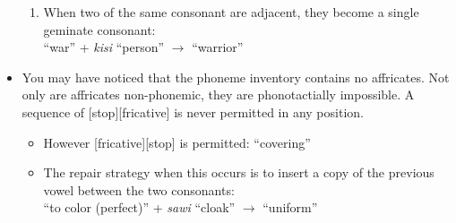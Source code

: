 \documentclass{article}
\begin{document}
\begin{itemize}
\begin{enumerate}
      \item When two of the same consonant are adjacent, they become a single geminate consonant: \\ \textit{} ``war'' + \textit{kisi} ``person'' $\rightarrow$ \textit{} ``warrior''


    \end{enumerate}

  \item You may have noticed that the phoneme inventory contains no affricates. Not only are affricates non-phonemic, they are phonotactially impossible. A sequence of [stop][fricative] is never permitted in any position.
  \begin{itemize}
    \item However [fricative][stop] is permitted: \textit{} ``covering''
    \item The repair strategy when this occurs is to insert a copy of the previous vowel between the two consonants: \\ \textit{} ``to color (perfect)'' + \textit{sawi} ``cloak'' $\rightarrow$ \textit{} ``uniform''
  \end{itemize}
\end{itemize}



\newpage
\end{document}
